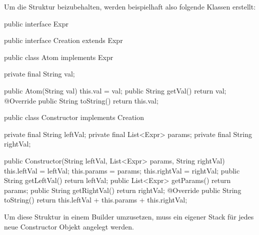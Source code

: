 \newpage
Um die Struktur beizubehalten, werden beispielhaft also folgende Klassen erstellt:
\begin{code}[language=java, caption={Grundlegende AST-Klassen}, label={lst:Aufgabe2b_Classes}]
public interface Expr {
}

public interface Creation extends Expr {
}

public class Atom implements Expr {
    private final String val;

    public Atom(String val) {
        this.val = val;
    }
    public String getVal() {
        return val;
    }
    @Override
    public String toString() {
        return this.val;
    }
}

public class Constructor implements Creation {
    private final String leftVal;
    private final List<Expr> params;
    private final String rightVal;

    public Constructor(String leftVal, List<Expr> params, String rightVal) {
        this.leftVal = leftVal;
        this.params = params;
        this.rightVal = rightVal;
    }
    public String getLeftVal() {
        return leftVal;
    }
    public List<Expr> getParams() {
        return params;
    }
    public String getRightVal() {
        return rightVal;
    }
    @Override
    public String toString() {
        return this.leftVal + this.params + this.rightVal;
    }
}
\end{code}

Um diese Struktur in einem Builder umzusetzen, muss ein eigener Stack für
jedes neue Constructor Objekt angelegt werden.

